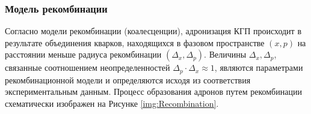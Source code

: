 

\subsubsection{Модель рекомбинации} \label{ch1/Recombination}
Согласно модели рекомбинации (коалесценции)\cite{Recombination1, Recombination2}, адронизация КГП происходит в результате объединения кварков, находящихся в фазовом пространстве $(x, p)$ на расстоянии меньше радиуса рекомбинации $(\Delta_x, \Delta_p)$. Величины $\Delta_x, \Delta_p$, связанные соотношением неопределенностей $\Delta_p \cdot \Delta_x \approx 1$, являются параметрами рекомбинационной модели и определяются исходя из соответствия экспериментальным данным. Процесс образования адронов путем рекомбинации схематически изображен на Рисунке \ref{img:Recombination}.

